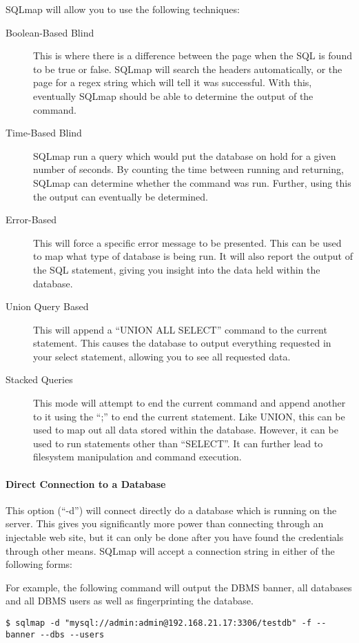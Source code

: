 			SQLmap will allow you to use the following techniques:
			\begin{description}
				\item[Boolean-Based Blind] This is where there is a difference between the page when the SQL is found to be true or false.
					SQLmap will search the headers automatically, or the page for a regex string which will tell it was successful.
					With this, eventually SQLmap should be able to determine the output of the command.
				\item[Time-Based Blind] SQLmap run a query which would put the database on hold for a given number of seconds.
					By counting the time between running and returning, SQLmap can determine whether the command was run.
					Further, using this the output can eventually be determined.
				\item[Error-Based] This will force a specific error message to be presented.
					This can be used to map what type of database is being run.
					It will also report the output of the SQL statement, giving you insight into the data held within the database.
				\item[Union Query Based] This will append a ``UNION ALL SELECT'' command to the current statement.
					This causes the database to output everything requested in your select statement, allowing you to see all requested data.
				\item[Stacked Queries] This mode will attempt to end the current command and append another to it using the ``;'' to end the current statement.
					Like UNION, this can be used to map out all data stored within the database.
					However, it can be used to run statements other than ``SELECT''.
					It can further lead to filesystem manipulation and command execution.
			\end{description}
			\paragraph{Direct Connection to a Database}
				This option (``-d'') will connect directly do a database which is running on the server.
				This gives you significantly more power than connecting through an injectable web site, but it can only be done after you have found the credentials through other means.
				SQLmap will accept a connection string in either of the following forms:
				
				For example, the following command will output the DBMS banner, all databases and all DBMS users as well as fingerprinting the database.
				\begin{lstlisting}[style=CLI]
					$ sqlmap -d "mysql://admin:admin@192.168.21.17:3306/testdb" -f --banner --dbs --users
				\end{lstlisting}

